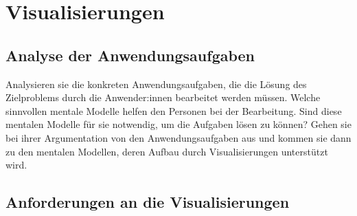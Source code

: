 \section{Visualisierungen}

\subsection{Analyse der Anwendungsaufgaben}

Analysieren sie die konkreten Anwendungsaufgaben, die die Lösung des Zielproblems durch die Anwender:innen bearbeitet werden müssen. 
Welche sinnvollen mentale Modelle helfen den Personen bei der Bearbeitung. 
Sind diese mentalen Modelle für sie notwendig, um die Aufgaben lösen zu können? Gehen sie bei ihrer Argumentation von den Anwendungsaufgaben aus und kommen sie dann zu den mentalen Modellen, deren Aufbau durch Visualisierungen unterstützt wird. 
\subsection{Anforderungen an die Visualisierungen}

